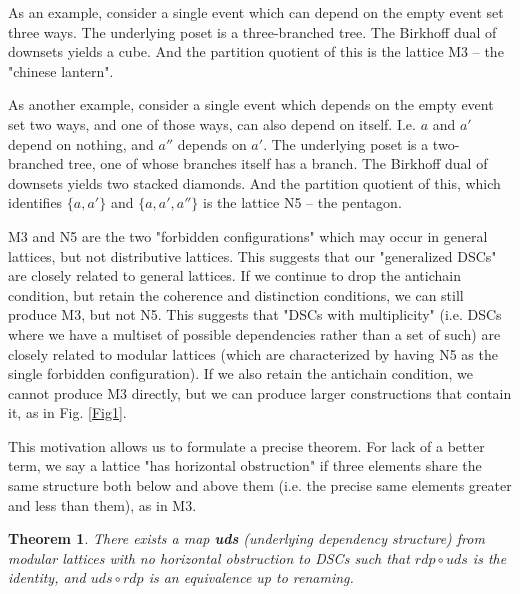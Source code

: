\documentclass[hoptionsi,review,format=acmsmall]{acmart}
\newtheorem{theorem}{Theorem}[section]
\theoremstyle{definition}
\begin{document}
As an example, consider a single event which can depend on the empty event set three ways. The underlying poset is a three-branched tree. The Birkhoff dual of downsets yields a cube. And the partition quotient of this is the lattice M3 -- the "chinese lantern".


As another example, consider a single event which depends on the empty event set two ways, and one of those ways, can also depend on itself. I.e. \(a\) and \(a'\) depend on nothing, and \(a''\) depends on \(a'\). The underlying poset is a two-branched tree, one of whose branches itself has a branch. The Birkhoff dual of downsets yields two stacked diamonds. And the partition quotient of this, which identifies \(\{a,a'\}\) and  \(\{a,a',a''\}\) is the lattice N5 -- the pentagon.


M3 and N5 are the two "forbidden configurations" which may occur in general lattices, but not distributive lattices. This suggests that our "generalized DSCs" are closely related to general lattices. If we continue to drop the antichain condition, but retain the coherence and distinction conditions, we can still produce M3, but not N5. This suggests that "DSCs with multiplicity" (i.e. DSCs where we have a multiset of possible dependencies rather than a set of such) are closely related to modular lattices (which are characterized by having N5 as the single forbidden configuration). If we also retain the antichain condition, we cannot produce M3 directly, but we can produce larger constructions that contain it, as in Fig. \ref{Fig1}.

This motivation allows us to formulate a precise theorem. For lack of a better term, we say a lattice "has horizontal obstruction" if three elements share the same structure both below and above them (i.e. the precise same elements greater and less than them), as in M3. 

\begin{theorem}
\label{representation}
There exists a map \textbf{uds} (underlying dependency structure) from modular lattices with no horizontal obstruction to DSCs such that  \(rdp \circ uds\) is the identity, and \(uds \circ rdp\) is an equivalence up to renaming.
\end{theorem}
\end{document}
